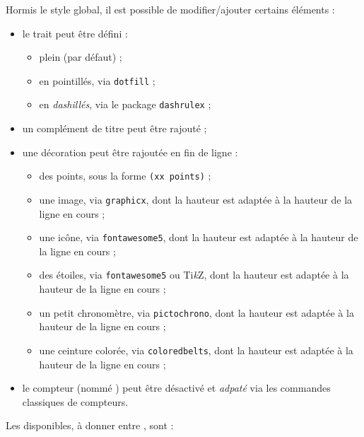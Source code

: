 \documentclass[french,11pt,a4paper]{article}
\providecommand\tikzlogo{Ti\textit{k}Z}
\let\TikZ\tikzlogo
\begin{document}
Hormis le style global, il est possible de modifier/ajouter certains éléments :

\begin{itemize}
	\item le trait peut être défini :
	\begin{itemize}
		\item plein (par défaut) ;
		\item en pointillés, via \texttt{dotfill} ;
		\item en \textit{dashillés}, via le package \texttt{dashrulex} ;
	\end{itemize}
	\item un complément de titre peut être rajouté ;
	\item une décoration peut être rajoutée en fin de ligne :
	\begin{itemize}
		\item des points, sous la forme \texttt{(xx points)} ;
		\item une image, via \texttt{graphicx}, dont la hauteur est adaptée à la hauteur de la ligne en cours ;
		\item une icône, via \texttt{fontawesome5}, dont la hauteur est adaptée à la hauteur de la ligne en cours ;
		\item des étoiles, via \texttt{fontawesome5} ou \TikZ, dont la hauteur est adaptée à la hauteur de la ligne en cours ;
		\item un petit chronomètre, via \texttt{pictochrono}, dont la hauteur est adaptée à la hauteur de la ligne en cours ;
		\item une ceinture colorée, via \texttt{coloredbelts}, dont la hauteur est adaptée à la hauteur de la ligne en cours ;
	\end{itemize}
	\item le compteur (nommé ) peut être désactivé et \textit{adpaté} via les commandes classiques de compteurs.
\end{itemize}

Les  disponibles, à donner entre \MontreCode{[...]}, sont :
\end{document}
